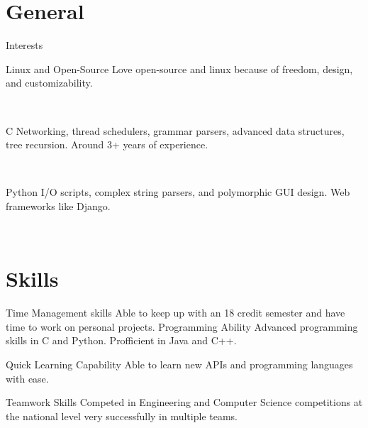 \documentclass[]{alternate}
\begin{document}

\section{General}{Interests}

\vspace{-0.3cm}
\begin{entrylist}
\entry
{}
{Linux and Open-Source}
{}
{Love open-source and linux because of freedom, design, and customizability.}

\end{entrylist}\
\begin{entrylist}
\entry
{}
{C}
{}
{Networking, thread schedulers, grammar parsers, advanced data structures, tree recursion. Around 3+ years of experience.}
\end{entrylist}\
\begin{entrylist}
\entry
{}
{Python}
{}
{I/O scripts, complex string parsers, and polymorphic GUI design. Web frameworks like Django.}

\end{entrylist}\

\section{Skills}{}

\vspace{-0.2cm}

\begin{entrylist}
\entry
  {}
  {Time Management skills}
  {}
  {Able to keep up with an 18 credit semester and have time to work on personal projects.}
\entry
  {}
  {Programming Ability }
  {}
  {Advanced programming skills in C and Python. Profficient in Java and C++.}
  
  \entry
  {}
  {Quick Learning Capability}
  {}
  {Able to learn new APIs and programming languages with ease.}
  
  \entry
  {}
  {Teamwork Skills}
  {}
  {Competed in Engineering and Computer Science competitions at the national level very successfully in multiple teams.}

  

\end{entrylist}


\end{document}
